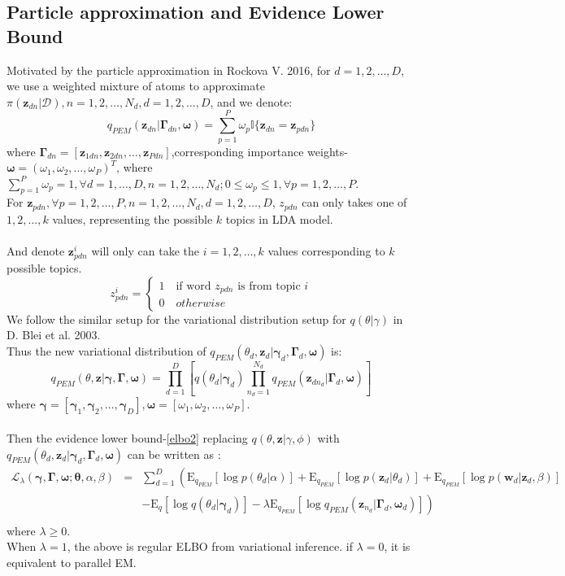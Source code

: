 \documentclass{article}
\newcommand{\be}{\begin{equation}}
\newcommand{\ee}{\end{equation}}
\newcommand{\bs}{\boldsymbol}
\newcommand{\ba}{\begin{array}}
\newcommand{\ea}{\end{array}}
\newcommand{\E}{\mathrm{E}}
\newcommand{\Sum}{\displaystyle\sum}
\newcommand{\Prod}{\displaystyle\prod}
\begin{document}
\subsection{Particle approximation and Evidence Lower Bound}
Motivated by the particle approximation in Rockova V. 2016, for $d=1,2,\ldots,D$, we use a weighted mixture of atoms to approximate $\pi(\bs{z}_{dn}|\mathcal{D}),n=1,2,\ldots,N_d,d=1,2,\ldots,D$, and we denote:\\
\[
q_{PEM}(\bs{z}_{dn}|\bs{\Gamma}_{dn},\bs{\omega})=\Sum_{p=1}^{P}\omega_{p}\mathbb{I}\{\bs{z}_{dn}=\bs{z}_{pdn}\}
\]
where $\bs{\Gamma}_{dn}=[\bs{z}_{1dn},\bs{z}_{2dn},\ldots,\bs{z}_{Pdn}]$,corresponding importance weights-$\bs{\omega}=(\omega_{1},\omega_{2},\ldots,\omega_{P})^T$, where $\sum_{p=1}^{P}\omega_{p}=1,\forall d=1,\ldots,D,n=1,2,\ldots,N_d;0\le\omega_{p}\le 1,\forall p=1,2,\ldots,P$.\\
For $\bs{z}_{pdn},\forall p=1,2,\ldots,P,n=1,2,\ldots,N_d,d=1,2,\ldots,D$, $z_{pdn}$ can only takes one of $1,2,\ldots,k$ values, representing the possible $k$ topics in LDA model. \\
\\
And denote $\bs{z}_{pdn}^{i}$ will only can take the $i=1,2,\ldots,k$ values corresponding to $k$ possible topics.\\
\[
z_{pdn}^i=\begin{cases}
1\quad\mbox{if word $z_{pdn}$ is from topic $i$}\\
0\quad otherwise
\end{cases}
\]
We follow the similar setup for the variational distribution setup for $q(\theta|\gamma)$ in D. Blei et al. 2003.\\
Thus the new variational distribution of $q_{PEM}(\theta_d,\bs{z}_d|\bs{\gamma}_d,\bs{\Gamma}_d,\bs{\omega})$ is:\\
\[
q_{PEM}(\theta,\bs{z}|\bs{\gamma},\bs{\Gamma},\bs{\omega})=\Prod_{d=1}^{D}\left[q(\theta_d|\bs{\gamma}_d)\Prod_{n_d=1}^{N_d}q_{PEM}(\bs{z}_{dn_d}|\bs{\Gamma}_d,\bs{\omega})\right]
\]
where $\bs{\gamma}=[\bs{\gamma}_1,\bs{\gamma}_2,\ldots,\bs{\gamma}_D],\bs{\omega}=[\omega_1,\omega_2,\ldots,\omega_P]$.\\
\\
Then the evidence lower bound-\ref{elbo2} replacing $q(\theta,\bs{z}|\gamma,\phi)$ with $q_{PEM}(\theta_d,\bs{z}_d|\bs{\gamma}_d,\bs{\Gamma}_d,\bs{\omega})$ can be written as :\\
\be\label{elbo3}
\ba{rcl}
\mathcal{L}_{\lambda}(\bs{\gamma},\bs{\Gamma},\bs{\omega};\bs{\theta},\alpha,\beta)&=&\Sum_{d=1}^{D}\left(\E_{q_{PEM}}[\log p(\theta_d|\alpha)]+\E_{q_{PEM}}[\log p(\bs{z}_d|\theta_d)]+\E_{q_{PEM}}[\log p(\bs{w}_d|\bs{z}_d,\beta)]\right.\\
&&\left.-\E_{q}[\log q(\theta_d|\bs{\gamma}_d)]-\lambda\E_{q_{PEM}}[\log q_{PEM}(\bs{z}_{n_d}|\bs{\Gamma}_d,\bs{\omega}_d)]\right)\\
\ea
\ee
where $\lambda\ge 0$.\\
When $\lambda=1$, the above is regular ELBO from variational inference. if $\lambda=0$, it is equivalent to parallel EM.
\end{document}
